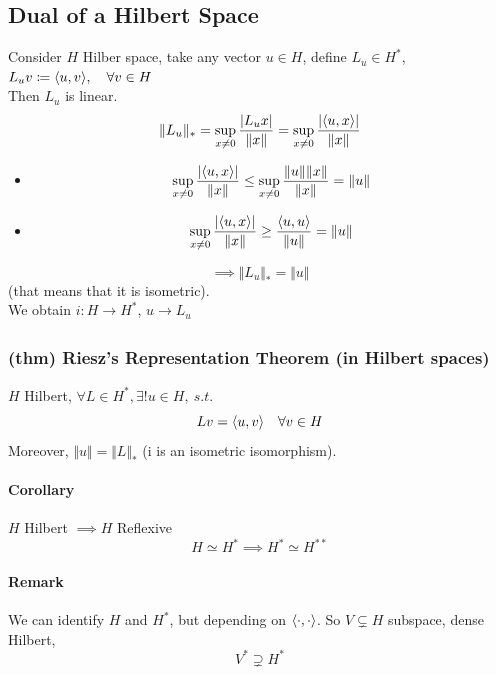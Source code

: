 \subsection{Dual of a Hilbert Space}
Consider $H$ Hilber space, take any vector $u\in H$, define $L_u\in H^*$, $L_uv\coloneqq \langle {u} , {v} \rangle,\quad \forall v\in H$\\
Then $L_u$ is linear.
$$\Vert L_u\Vert _*=\sup_{x\neq 0}\frac{|L_ux|}{\Vert x\Vert }=\sup_{x\neq 0}\frac{|\langle {u} , {x} \rangle|}{\Vert x\Vert} $$
\begin{itemize}
    \item $$\sup_{x\neq 0}\frac{|\langle {u} , {x} \rangle|}{\Vert x\Vert}\leq \sup_{x\neq 0}\frac{\Vert u\Vert \Vert x\Vert}{\Vert x\Vert}=\Vert u\Vert$$
    \item $$\sup_{x\neq 0}\frac{|\langle {u} , {x} \rangle|}{\Vert x\Vert}\geq \frac{\langle {u} , {u} \rangle}{\Vert u\Vert}=\Vert u\Vert$$
\end{itemize}
$$\implies \Big \Vert L_u\Big \Vert _*=\Vert u\Vert $$
(that means that it is isometric).\\
We obtain $i:H\xrightarrow[\quad]{} H^*$, $u \xrightarrow[\quad]{}L_u$
\subsubsection{(thm) Riesz's Representation Theorem (in Hilbert spaces)}
$H$ Hilbert, $\forall L\in H^*, \exists !u\in H, \ s.t.$
$$Lv=\langle {u} , {v} \rangle \quad \forall v\in H$$
Moreover, $\Vert u\Vert =\Vert L\Vert_*$ (i is an isometric isomorphism).
\paragraph{Corollary} $H$ Hilbert $\implies H$ Reflexive
$$H\simeq H^*\implies H^*\simeq H^{**}$$
\paragraph{Remark}
We can identify $H$ and $H^*$, but depending on $\langle {\cdot} , {\cdot} \rangle$. So $V\subsetneq H$ subspace, dense Hilbert,
$$V^*\supsetneq H^*$$
